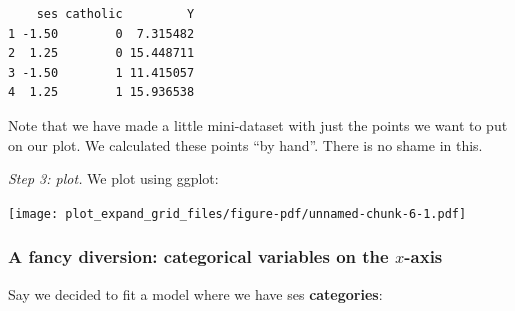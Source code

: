 \documentclass[
  letterpaper,
  DIV=11,
  numbers=noendperiod]{scrreprt}
\newenvironment{Shaded}{}{}
\newcommand{\AttributeTok}[1]{\textcolor[rgb]{0.49,0.56,0.16}{#1}}
\newcommand{\ConstantTok}[1]{\textcolor[rgb]{0.53,0.00,0.00}{#1}}
\newcommand{\DecValTok}[1]{\textcolor[rgb]{0.25,0.63,0.44}{#1}}
\newcommand{\FloatTok}[1]{\textcolor[rgb]{0.25,0.63,0.44}{#1}}
\newcommand{\FunctionTok}[1]{\textcolor[rgb]{0.02,0.16,0.49}{#1}}
\newcommand{\NormalTok}[1]{#1}
\newcommand{\OtherTok}[1]{\textcolor[rgb]{0.00,0.44,0.13}{#1}}
\newcommand{\SpecialCharTok}[1]{\textcolor[rgb]{0.25,0.44,0.63}{#1}}
\newcommand{\StringTok}[1]{\textcolor[rgb]{0.25,0.44,0.63}{#1}}
\begin{document}
\begin{verbatim}
    ses catholic         Y
1 -1.50        0  7.315482
2  1.25        0 15.448711
3 -1.50        1 11.415057
4  1.25        1 15.936538
\end{verbatim}

Note that we have made a little mini-dataset with just the points we
want to put on our plot. We calculated these points ``by hand''. There
is no shame in this.

\emph{Step 3: plot.} We plot using ggplot:

\begin{Shaded}
\end{Shaded}

\texttt{[image: plot\_expand\_grid\_files/figure-pdf/unnamed-chunk-6-1.pdf]}

\subsubsection{\texorpdfstring{A fancy diversion: categorical variables
on the
\(x\)-axis}{A fancy diversion: categorical variables on the x-axis}}\label{a-fancy-diversion-categorical-variables-on-the-x-axis}

Say we decided to fit a model where we have ses \textbf{categories}:

\begin{Shaded}
\end{Shaded}
\end{document}
